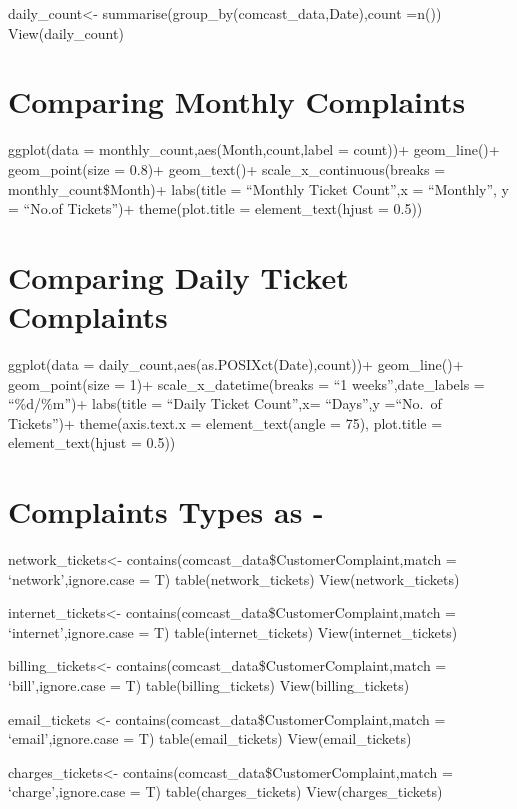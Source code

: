 \documentclass[
]{article}
\begin{document}
daily\_count\textless- summarise(group\_by(comcast\_data,Date),count
=n()) View(daily\_count)

\hypertarget{comparing-monthly-complaints}{%
\section{Comparing Monthly
Complaints}\label{comparing-monthly-complaints}}

ggplot(data = monthly\_count,aes(Month,count,label = count))+
geom\_line()+ geom\_point(size = 0.8)+ geom\_text()+
scale\_x\_continuous(breaks = monthly\_count\$Month)+ labs(title =
``Monthly Ticket Count'',x = ``Monthly'', y = ``No.of Tickets'')+
theme(plot.title = element\_text(hjust = 0.5))

\hypertarget{comparing-daily-ticket-complaints}{%
\section{Comparing Daily Ticket
Complaints}\label{comparing-daily-ticket-complaints}}

ggplot(data = daily\_count,aes(as.POSIXct(Date),count))+ geom\_line()+
geom\_point(size = 1)+ scale\_x\_datetime(breaks = ``1
weeks'',date\_labels = ``\%d/\%m'')+ labs(title = ``Daily Ticket
Count'',x= ``Days'',y =``No.~of Tickets'')+ theme(axis.text.x =
element\_text(angle = 75), plot.title = element\_text(hjust = 0.5))

\hypertarget{complaints-types-as--}{%
\section{Complaints Types as -}\label{complaints-types-as--}}

network\_tickets\textless-
contains(comcast\_data\$CustomerComplaint,match = `network',ignore.case
= T) table(network\_tickets) View(network\_tickets)

internet\_tickets\textless-
contains(comcast\_data\$CustomerComplaint,match = `internet',ignore.case
= T) table(internet\_tickets) View(internet\_tickets)

billing\_tickets\textless-
contains(comcast\_data\$CustomerComplaint,match = `bill',ignore.case =
T) table(billing\_tickets) View(billing\_tickets)

email\_tickets \textless-
contains(comcast\_data\$CustomerComplaint,match = `email',ignore.case =
T) table(email\_tickets) View(email\_tickets)

charges\_tickets\textless-
contains(comcast\_data\$CustomerComplaint,match = `charge',ignore.case =
T) table(charges\_tickets) View(charges\_tickets)
\end{document}
